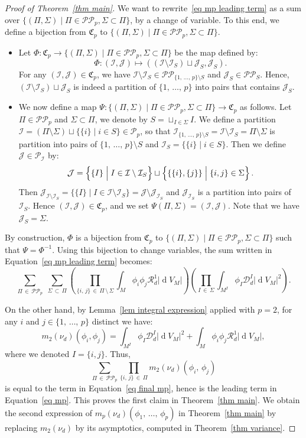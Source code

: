 \documentclass[10pt]{amsart}
\theoremstyle{definition}\newtheorem{defi}[theo]{Definition}\newtheorem{rema}[theo]{Remark}\newtheorem{exam}[theo]{Example}\newtheorem{exem}[theo]{Example}\newtheorem{nota}[theo]{Notation}
\DeclareMathOperator{\dmesure}{d}
\newcommand{\D}{\mathcal{D}}
\newcommand{\I}{\mathcal{I}}
\newcommand{\J}{\mathcal{J}}
\newcommand{\clR}{\mathcal{R}}
\newcommand{\frkC}{\mathfrak{C}}
\newcommand{\pa}{\mathcal{P}\!}
\newcommand{\pp}{\mathcal{P\!P}\!}
\newcommand{\mvert}{\mathrel{}\middle|\mathrel{}}
\newcommand{\norm}[1]{\left\lvert #1 \right\rvert}
\newcommand{\rmes}[1]{\norm{\dmesure\! V_{#1}}}
\begin{document}
\begin{proof}[{Proof of Theorem~\ref{thm main}}]
We want to rewrite~\eqref{eq mp leading term} as a sum over $\{(\Pi,\Sigma) \mid \Pi \in \pp_p, \Sigma \subset \Pi\}$, by a change of variable. To this end, we define a bijection from $\frkC_p$ to $\{(\Pi,\Sigma) \mid \Pi \in \pp_p, \Sigma \subset \Pi\}$.
\begin{itemize}
\item Let $\Phi:\frkC_p \to \{(\Pi,\Sigma) \mid \Pi \in \pp_p, \Sigma \subset \Pi\}$ be the map defined by:
\[
\Phi:(\I,\J) \mapsto \left(\left(\I \setminus \I_S\right) \sqcup \J_S, \J_S\right).
\]
For any $(\I,\J) \in \frkC_p$, we have $\I \setminus \I_S \in \pp_{\{1,\,\dots,\,p\} \setminus S}$ and $\J_S \in \pp_S$. Hence, $(\I \setminus \I_S) \sqcup \J_S$ is indeed a partition of $\{1,\,\dots,\,p\}$ into pairs that contains $\J_S$.
\item We now define a map $\Psi:\{(\Pi,\Sigma) \mid \Pi \in \pp_p, \Sigma \subset \Pi\} \to \frkC_p$ as follows. Let $\Pi \in \pp_p$ and $\Sigma \subset \Pi$, we denote by $S = \sqcup_{I \in \Sigma} I$. We define a partition $\I = (\Pi \setminus \Sigma) \sqcup \{\{i\} \mid i \in S\} \in \pa_p$, so that $\I_{\{1,\,\dots,\,p\} \setminus S} = \I \setminus \I_S = \Pi \setminus \Sigma$ is partition into pairs of $\{1,\,\dots,\,p\} \setminus S$ and $\I_S = \{\{i\} \mid i \in S\}$. Then we define $\J \in \pa_\I$ by:
\[
\J = \left\{\rule{0em}{2.5ex} \{I\} \mvert I \in \I \setminus \I_S\right\} \sqcup \left\{\rule{0em}{2.5ex} \{\{i\},\{j\}\} \mvert \{i,j\} \in \Sigma\right\}.
\]
Then $\J_{\I \setminus \I_S} = \{\{I\} \mid I \in \I \setminus \I_S\} = \J \setminus \J_{\I_S}$ and $\J_{\I_S}$ is a partition into pairs of $\I_S$. Hence $(\I,\J) \in \frkC_p$, and we set $\Psi(\Pi,\Sigma)=(\I,\J)$. Note that we have $\J_S = \Sigma$.
\end{itemize}
By construction, $\Phi$ is a bijection from $\frkC_p$ to $\{(\Pi,\Sigma) \mid \Pi \in \pp_p, \Sigma \subset \Pi\}$ such that $\Psi = \Phi^{-1}$. Using this bijection to change variables, the sum written in Equation~\eqref{eq mp leading term} becomes:
\begin{equation}\label{eq final mp}
\sum_{\Pi\,\in\,\pp_p}\;\sum_{\Sigma\,\subset\,\Pi} \left(\prod_{\{i,\,j\}\,\in\,\Pi\,\setminus\,\Sigma} \int_M \phi_i\phi_j\clR^1_d \rmes{M}\right)\left(\prod_{I\,\in\,\Sigma} \int_{M^I} \phi_I \D_d^I \rmes{M}^2 \right).
\end{equation}

On the other hand, by Lemma~\ref{lem integral expression} applied with $p=2$, for any $i$ and $j \in \{1,\,\dots,\,p\}$ distinct we have:
\[
m_2(\nu_d)\left(\phi_i,\phi_j\right) =\int_{M^I} \phi_I \D_d^I \rmes{M}^2 + \int_M \phi_i\phi_j \clR^1_d \rmes{M},
\]
where we denoted $I = \{i,j\}$. Thus,
\[
\sum_{\Pi\,\in\,\pp_p} \prod_{\{i,\,j\}\,\in\,\Pi} m_2(\nu_d)\left(\phi_i,\,\phi_j\right)
\]
is equal to the term in Equation~\eqref{eq final mp}, hence is the leading term in Equation~\eqref{eq mp}. This proves the first claim in Theorem~\ref{thm main}. We obtain the second expression of $m_p(\nu_d)(\phi_1,\,\dots,\,\phi_p)$ in Theorem~\ref{thm main} by replacing $m_2(\nu_d)$ by its asymptotics, computed in Theorem~\ref{thm variance}.


\end{proof}
\end{document}
